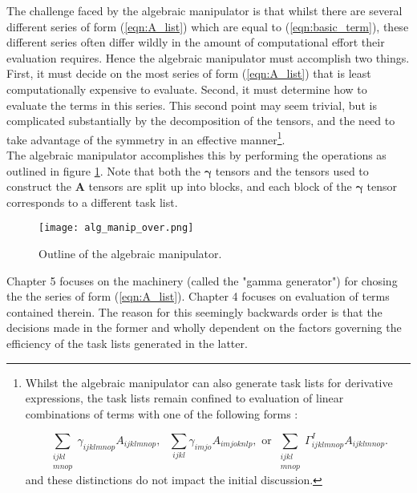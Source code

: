 \noindent The challenge faced by the algebraic manipulator is that whilst there are several different
series of form (\ref{eqn:A_list}) which are equal to (\ref{eqn:basic_term}), these different series 
often differ wildly in the amount of computational effort their evaluation requires. Hence the algebraic manipulator must
accomplish two things. First, it must decide on the most series of form (\ref{eqn:A_list}) that is least computationally expensive to
evaluate. Second, it must determine how to evaluate the terms in this series. This second point may seem trivial,
but is complicated substantially by the decomposition of the tensors, and the need to take advantage of the symmetry in 
an effective manner\footnote{Whilst
the algebraic manipulator can also generate task lists for derivative expressions, the task lists remain 
confined to evaluation of linear combinations of terms with one of the following forms : 

\begin{equation}
\sum_{\substack{ijkl \\ mnop} }\gamma_{ijklmnop} A_{ijklmnop},
\text{ \ \ \ \ \ \ \ \ }
\sum_{ijkl}\gamma_{imjo} A_{imjoknlp},
\text{ \ \ \ \ or  \ \ \ \ }
\sum_{\substack{ijkl \\ mnop}}\Gamma^{I}_{ijklmnop} A_{ijklmnop}.
\label{eqn:kinds_of_terms}
\end{equation}
\noindent and these distinctions do not impact the initial discussion.}.\\

\noindent The algebraic manipulator accomplishes this by performing the operations as outlined in figure
\ref{fig:alg_manip_overview}. Note that both the $\mathbf{\gamma}$ tensors
and the tensors used to construct the $\mathbf{A}$ tensors are split up into blocks, and each block 
of the $\mathbf{\gamma}$ tensor corresponds to a different task list.

\begin{figure}[!ht]
\begin{center}
\texttt{[image: alg\_manip\_over.png]}
\caption{ Outline of the algebraic manipulator. }
\end{center}
\label{fig:alg_manip_overview}
\end{figure}

\noindent Chapter 5 focuses on the machinery (called the "gamma generator") for
chosing the the series of form (\ref{eqn:A_list}). Chapter 4 focuses on
evaluation of terms contained therein. The reason for this seemingly backwards
order is that the decisions made in the former and wholly dependent on the
factors governing the efficiency of the task lists generated in the latter.\\

